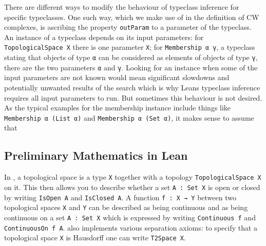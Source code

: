 There are different ways to modify the behaviour of typeclass inference for specific typeclasses. 
One such way, which we make use of in the definition of CW complexes, is ascribing the property \lstinline|outParam| to a parameter of the typeclass. 
An instance of a typeclass depends on its input parameters: for \lstinline|TopologicalSpace X| there is one parameter \lstinline|X|; for \lstinline|Membership α γ|, a typeclass stating that objects of type \lstinline|α| can be considered as elements of objects of type \lstinline|γ|, there are the two parameters \lstinline|α| and \lstinline|γ|.
Looking for an instance when some of the input parameters are not known would mean significant slowdowns and potentially unwanted results of the search which is why Leans typeclass inference requires all input parameters to run. 
But sometimes this behaviour is not desired. 
As the typical examples for the membership instance include things like \lstinline|Membership α (List α)| and \lstinline|Membership α (Set α)|, it makes sense to assume that 

\subsection{Preliminary Mathematics in Lean}


In \mathlib, a topological space is a type \lstinline|X| together with a topology \lstinline|TopologicalSpace X| on it.
This then allows you to describe whether a set \lstinline|A : Set X| is open or closed by writing \lstinline|IsOpen A| and \lstinline|IsClosed A|. 
A function \lstinline|f : X → Y| between two topological spaces \lstinline|X| and \lstinline|Y| can be described as being continuous and as being continuous on a set \lstinline|A : Set X| which is expressed by writing \lstinline|Continuous f| and \lstinline|ContinuousOn f A|. 
\mathlib also implements various separation axioms: to specify that a topological space \lstinline|X| is Hausdorff one can write \lstinline|T2Space X|.
